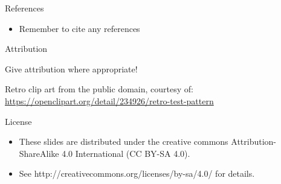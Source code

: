 \documentclass[aspectratio=169]{beamer}
\newcommand{\bi}{\begin{itemize}}
\newcommand{\ei}{\end{itemize}}
\begin{document}
\begin{frame}[noframenumbering]{References}
  \bi
\item Remember to cite any references
  \ei
\end{frame}

\begin{frame}[noframenumbering]{Attribution}
  \bi
  \item Give attribution where appropriate!
  {\small
  \item Retro clip art from the public domain, courtesy of:\\
    \url{https://openclipart.org/detail/234926/retro-test-pattern}}
  \ei
\end{frame}

\begin{frame}[noframenumbering]{License}
  \bi
\item These slides are distributed under the creative commons
  Attribution-ShareAlike 4.0 International (CC BY-SA 4.0).
\item See http://creativecommons.org/licenses/by-sa/4.0/ for details.
  \ei
\end{frame}
\end{document}
